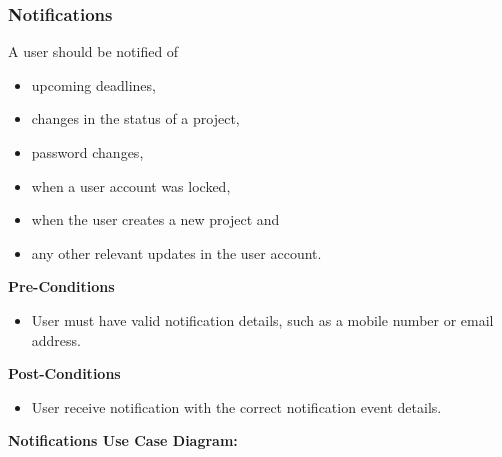 \subsubsection{Notifications}
A user should be notified of
\begin{itemize}
	\item upcoming deadlines,
	\item changes in the status of a project,
	\item password changes,
	\item when a user account was locked,
	\item when the user creates a new project and
	\item any other relevant updates in the user account.\\
\end{itemize}
\textbf{Pre-Conditions}
\begin{itemize}
	\item User must have valid notification details, such as a mobile number or email address.\\
\end{itemize}
\textbf{Post-Conditions}
\begin{itemize}
	\item User receive notification with the correct notification event details.\\
\end{itemize}
\textbf{Notifications Use Case Diagram:}\\
\centerline{}
